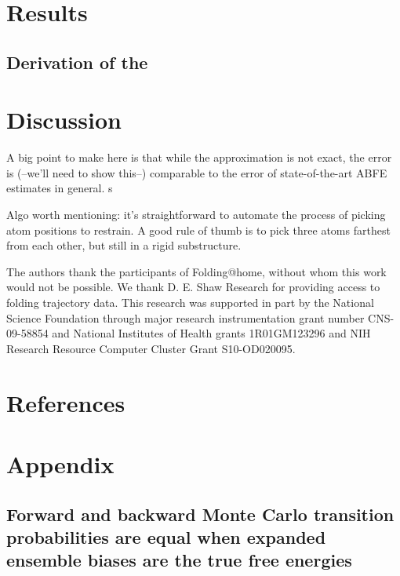 \documentclass[%
 aip,
 rsi,
 jmp,%
 amsmath,amssymb,
 reprint,%
]{revtex4-1}
\begin{document}
\section*{Results}

\subsection*{Derivation of the }





\section*{Discussion}


A big point to make here is that while the approximation is not exact, the error is (--we'll need to show this--) comparable to the error of state-of-the-art ABFE estimates in general.  s 

Algo worth mentioning: it's straightforward to automate the process of picking atom positions to restrain.  A good rule of thumb is to pick three atoms farthest from each other, but still in a rigid substructure. 


\begin{acknowledgments}
The authors thank the participants of Folding@home, without whom this work would not be possible.  We thank D. E. Shaw Research for providing access to folding trajectory data. This research was supported in part by the National Science Foundation through major research instrumentation grant number CNS-09-58854 and National Institutes of Health grants 1R01GM123296 and NIH Research Resource Computer Cluster Grant S10-OD020095.
\end{acknowledgments}

%


\section*{References}


\section*{Appendix}

\subsection{Forward and backward Monte Carlo transition probabilities are equal when expanded ensemble biases are the true free energies}
\end{document}

